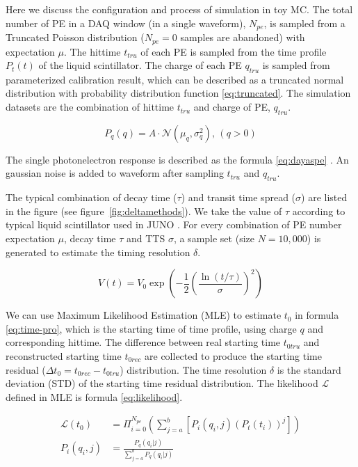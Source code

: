 Here we discuss the configuration and process of simulation in toy MC. The total number of PE in a DAQ window (in a single waveform), $N_{pe}$, is sampled from a Truncated Poisson distribution ($N_{pe}=0$ samples are abandoned) with expectation $\mu$. The hittime $t_{tru}$ of each PE is sampled from the time profile $P_{t}(t)$ of the liquid scintillator. The charge of each PE $q_{tru}$ is sampled from parameterized calibration result, which can be described as a truncated normal distribution with probability distribution function \eqref{eq:truncated}. The simulation datasets are the combination of hittime $t_{tru}$ and charge of PE, $q_{tru}$. 

\begin{equation}
    P_{q}(q) = A\cdot\mathcal{N}(\mu_{q},\sigma_{q}^{2}),\,(q>0)
    \label{eq:truncated}
\end{equation}

The single photonelectron response is described as the formula \eqref{eq:dayaspe} \cite{jetter_pmt_2012}. An gaussian noise is added to waveform after sampling $t_{tru}$ and $q_{tru}$. 

The typical combination of decay time ($\tau$) and transit time spread ($\sigma$) are listed in the figure (see figure~\ref{fig:deltamethods}). We take the value of $\tau$ according to typical liquid scintillator used in JUNO \cite{ludhova_particle_2020}. For every combination of PE number expectation $\mu$, decay time $\tau$ and TTS $\sigma$, a sample set (size $N=10,000$) is generated to estimate the timing resolution $\delta$. 

\begin{equation}
    V(t) = V_{0}\exp\left(-\frac{1}{2}\left(\frac{\ln(t/\tau)}{\sigma}\right)^{2}\right)
    \label{eq:dayaspe}
\end{equation}

We can use Maximum Likelihood Estimation (MLE) to estimate $t_{0}$ in formula \eqref{eq:time-pro}, which is the starting time of time profile, using charge $q$ and corresponding hittime. The difference between real starting time $t_{0tru}$ and reconstructed starting time $t_{0rec}$ are collected to produce the starting time residual ($\Delta t_{0}=t_{0rec}-t_{0tru}$) distribution. The time resolution $\delta$ is the standard deviation (STD) of the starting time residual distribution. The likelihood $\mathcal{L}$ defined in MLE is formula \eqref{eq:likelihood}. 

\begin{align}
    \mathcal{L}(t_{0}) &= \Pi_{i=0}^{N_{pe}}\left(\sum_{j=a}^{b}[P_{i}(q_{i},j)(P_{t}(t_{i}))^{j}]\right)
    \label{eq:likelihood} \\
    P_{i}(q_{i},j) &= \frac{P_{q}(q_{i}|j)}{\sum_{j=a}^{b}P_{q}(q_{i}|j)}
\end{align}

